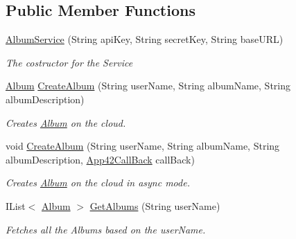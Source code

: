 \subsection*{Public Member Functions}
\begin{DoxyCompactItemize}
\item 
\hyperlink{classcom_1_1shephertz_1_1app42_1_1paas_1_1sdk_1_1csharp_1_1gallery_1_1_album_service_a3508396bbf2456e47827996116a58a9b}{Album\+Service} (String api\+Key, String secret\+Key, String base\+U\+R\+L)
\begin{DoxyCompactList}\small\item\em The costructor for the Service \end{DoxyCompactList}\item 
\hyperlink{classcom_1_1shephertz_1_1app42_1_1paas_1_1sdk_1_1csharp_1_1gallery_1_1_album}{Album} \hyperlink{classcom_1_1shephertz_1_1app42_1_1paas_1_1sdk_1_1csharp_1_1gallery_1_1_album_service_ac8c4fe1f101571e66d566113a0e2d93c}{Create\+Album} (String user\+Name, String album\+Name, String album\+Description)
\begin{DoxyCompactList}\small\item\em Creates \hyperlink{classcom_1_1shephertz_1_1app42_1_1paas_1_1sdk_1_1csharp_1_1gallery_1_1_album}{Album} on the cloud. \end{DoxyCompactList}\item 
void \hyperlink{classcom_1_1shephertz_1_1app42_1_1paas_1_1sdk_1_1csharp_1_1gallery_1_1_album_service_a585d12bf245dfe6fe1494d5652fd8281}{Create\+Album} (String user\+Name, String album\+Name, String album\+Description, \hyperlink{interfacecom_1_1shephertz_1_1app42_1_1paas_1_1sdk_1_1csharp_1_1_app42_call_back}{App42\+Call\+Back} call\+Back)
\begin{DoxyCompactList}\small\item\em Creates \hyperlink{classcom_1_1shephertz_1_1app42_1_1paas_1_1sdk_1_1csharp_1_1gallery_1_1_album}{Album} on the cloud in async mode. \end{DoxyCompactList}\item 
I\+List$<$ \hyperlink{classcom_1_1shephertz_1_1app42_1_1paas_1_1sdk_1_1csharp_1_1gallery_1_1_album}{Album} $>$ \hyperlink{classcom_1_1shephertz_1_1app42_1_1paas_1_1sdk_1_1csharp_1_1gallery_1_1_album_service_a0ea8e6243142c0280a8d8ea8fd4852df}{Get\+Albums} (String user\+Name)
\begin{DoxyCompactList}\small\item\em Fetches all the Albums based on the user\+Name. \end{DoxyCompactList}\item 

\end{DoxyCompactItemize}
